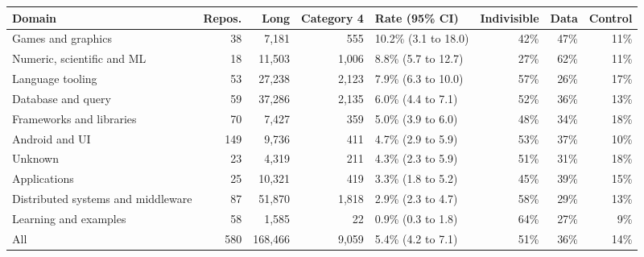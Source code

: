 \begin{tabular}{>{\raggedright\arraybackslash}p{4.6cm}rrrlrrr}
\toprule
Domain & Repos. & Long & Category 4 & Rate (95\% CI) & Indivisible & Data & Control \\
\midrule
Games and graphics & 38 & 7{,}181 & 555 & 10.2\% (3.1 to 18.0) & 42\% & 47\% & 11\% \\
Numeric, scientific and ML & 18 & 11{,}503 & 1{,}006 & 8.8\% (5.7 to 12.7) & 27\% & 62\% & 11\% \\
Language tooling & 53 & 27{,}238 & 2{,}123 & 7.9\% (6.3 to 10.0) & 57\% & 26\% & 17\% \\
Database and query & 59 & 37{,}286 & 2{,}135 & 6.0\% (4.4 to 7.1) & 52\% & 36\% & 13\% \\
Frameworks and libraries & 70 & 7{,}427 & 359 & 5.0\% (3.9 to 6.0) & 48\% & 34\% & 18\% \\
Android and UI & 149 & 9{,}736 & 411 & 4.7\% (2.9 to 5.9) & 53\% & 37\% & 10\% \\
Unknown & 23 & 4{,}319 & 211 & 4.3\% (2.3 to 5.9) & 51\% & 31\% & 18\% \\
Applications & 25 & 10{,}321 & 419 & 3.3\% (1.8 to 5.2) & 45\% & 39\% & 15\% \\
Distributed systems and middleware & 87 & 51{,}870 & 1{,}818 & 2.9\% (2.3 to 4.7) & 58\% & 29\% & 13\% \\
Learning and examples & 58 & 1{,}585 & 22 & 0.9\% (0.3 to 1.8) & 64\% & 27\% & 9\% \\
\midrule
All & 580 & 168{,}466 & 9{,}059 & 5.4\% (4.2 to 7.1) & 51\% & 36\% & 14\% \\
\bottomrule
\end{tabular}
